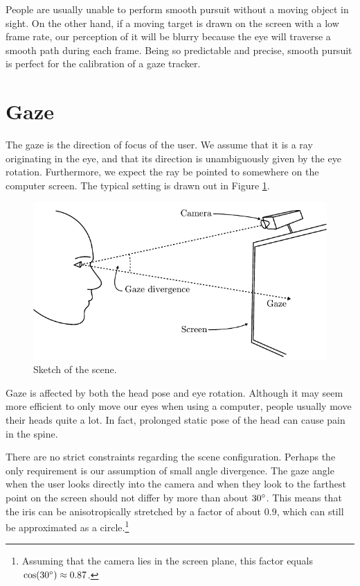 People are usually unable to perform smooth pursuit without a moving object in sight.
On the other hand, if a moving target is drawn on the screen with a low frame rate, our perception of it will be blurry because the eye will traverse a smooth path during each frame.
Being so predictable and precise, smooth pursuit is perfect for the calibration of a gaze tracker.

\section{Gaze}
\label{s:gaze-model}

The gaze is the direction of focus of the user.
We assume that it is a ray originating in the eye, and that its direction is unambiguously given by the eye rotation.
Furthermore, we expect the ray be pointed to somewhere on the computer screen.
The typical setting is drawn out in Figure \ref{i:analy-gaze}.

\begin{figure}[h]
	\centering 
	\centering \includegraphics{img/analy-gaze.pdf}
	\caption{Sketch of the scene.}\label{i:analy-gaze}
\end{figure}

Gaze is affected by both the head pose and eye rotation.
Although it may seem more efficient to only move our eyes when using a computer, people usually move their heads quite a lot.
In fact, prolonged static pose of the head can cause pain in the spine.

There are no strict constraints regarding the scene configuration.
Perhaps the only requirement is our assumption of small angle divergence.
The gaze angle when the user looks directly into the camera and when they look to the farthest point on the screen should not differ by more than about $30\degree$.
This means that the iris can be anisotropically stretched by a factor of about $0.9$, which can still be approximated as a circle.\footnote{
Assuming that the camera lies in the screen plane, this factor equals $\mathrm{cos}(30\degree) \approx 0.87$.
}

